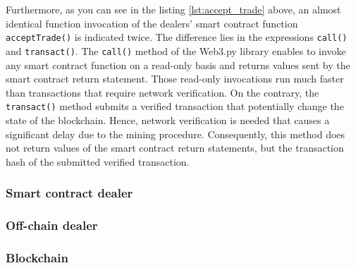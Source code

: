 Furthermore, as you can see in the listing \ref{lst:accept_trade} above, an almost identical function invocation of the dealers' smart contract 
function \verb|acceptTrade()| is indicated twice. 
The difference lies in the expressions \verb|call()| and \verb|transact()|. 
The \verb|call()| method of the Web3.py library enables to invoke any smart contract function on a read-only basis
and returns values sent by the smart contract return statement. 
Those read-only invocations run much faster than transactions that require network verification.
On the contrary, the \verb|transact()| method submits a verified transaction that potentially change the state 
of the blockchain. 
Hence, network verification is needed that causes a significant  delay due to the mining procedure.
Consequently, this method does not return values of the smart contract return statements,
but the transaction hash of the submitted verified transaction.


\begin{comment}
    Callers can invoke any contract function on a local read-only basis with the call() method Web3 attaches 
    to every contract function. This relies on local resources, and returns values sent by contract return statements.

    Read-only invocations, whether hard-coded at the contract level or requested with the client-side “call()” method, 
    run much faster than transactions that require network verification.

    Verified transactions that potentially change the state are sent to the network for verification. 
    Consequently, senders don’t receive return values. Instead, they receive a transaction hash and 
    must wait for the transaction to be mined. Even then, the return results won’t be returned and 
    they must inspect the logs or call other functions to discover what happened.
\end{comment}



\subsubsection{Smart contract dealer}

\subsubsection{Off-chain dealer}

\subsubsection{Blockchain}


